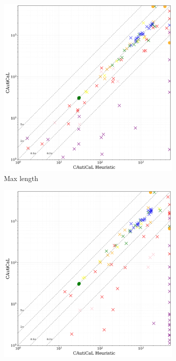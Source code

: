 \begin{figure}[!t]
    \begin{subfigure}[t]{0.3\textwidth}
        \centering
        \includegraphics[width=\textwidth]{figs/globalmaxlen_heuristic_comparison.jpg}
        \caption{Max length}
        \label{fig:cautical-vs-prelearn}
    \end{subfigure}
    \begin{subfigure}[t]{0.3\textwidth}
            \centering
            \includegraphics[width=\textwidth]{figs/globalnoshrink_heuristic_comparison.jpg}

\end{subfigure}
\end{figure}
